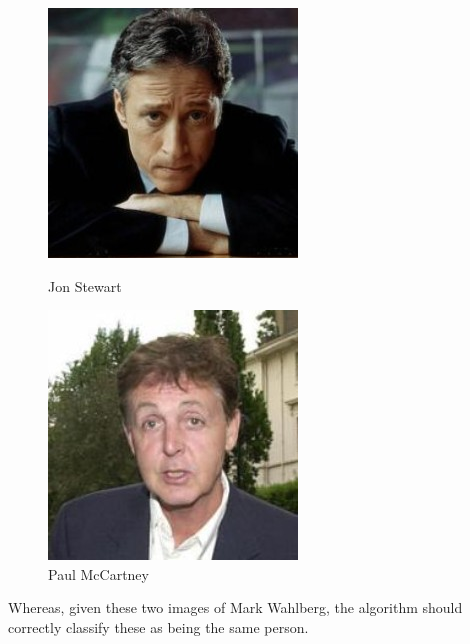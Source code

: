 \documentclass[12pt, a4paper]{article}
\begin{document}
\begin{figure}[H]
  \includegraphics[width=\linewidth]{images/Jon_Stewart_0001.jpg}
  \caption{Jon Stewart}
\endminipage\hfill
{}
  \includegraphics[width=\linewidth]{images/Paul_McCartney_0004.jpg}
  \caption{Paul McCartney}
\endminipage\hfill
\end{figure}
Whereas, given these two images of Mark Wahlberg, the algorithm should correctly classify these as being the same person.
\end{document}
